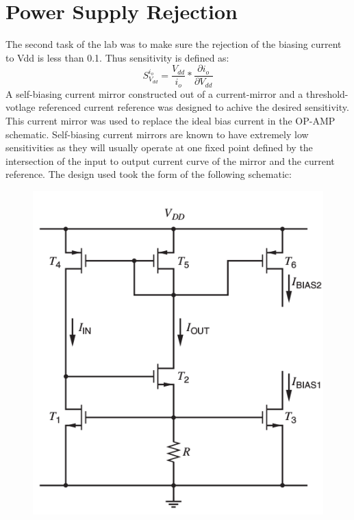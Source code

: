 \documentclass[12pt]{article}
\begin{document}
\section{Power Supply Rejection}
The second task of the lab was to make sure the rejection of the biasing current to Vdd is less than 0.1.
Thus sensitivity is defined as:
\begin{equation}
S_{V_{dd}}^{i_o} = \frac{V_{dd}}{i_o}*\frac{\partial i_o}{\partial V_{dd}}
\end{equation}
A self-biasing current mirror constructed out of a current-mirror and a threshold-votlage referenced current reference was designed to achive the desired sensitivity. This current mirror was used to replace the ideal bias current in the OP-AMP schematic. Self-biasing current mirrors are known to have extremely low sensitivities as they will usually operate at one fixed point defined by the intersection of the input to output current curve of the mirror and the current reference. The design used took the form of the following schematic:
\FloatBarrier
\begin{figure}[h!]
\begin{center}
 \includegraphics[scale=0.3]{./currf.png}
\end{center}
\end{figure}
\end{document}

